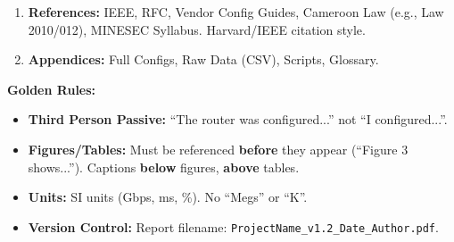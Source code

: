 \documentclass[11pt]{article}
\begin{document}
\begin{methode}
\begin{enumerate}
    \item \textbf{References:} IEEE, RFC, Vendor Config Guides, Cameroon Law (e.g., Law 2010/012), MINESEC Syllabus. Harvard/IEEE citation style.
    \item \textbf{Appendices:} Full Configs, Raw Data (CSV), Scripts, Glossary.
\end{enumerate}
\textbf{Golden Rules:} 
\begin{itemize}
    \item \textbf{Third Person Passive:} ``The router was configured...'' not ``I configured...''.
    \item \textbf{Figures/Tables:} Must be referenced \textbf{before} they appear (``Figure 3 shows...''). Captions \textbf{below} figures, \textbf{above} tables.
    \item \textbf{Units:} SI units (Gbps, ms, \%). No ``Megs'' or ``K''.
    \item \textbf{Version Control:} Report filename: \texttt{ProjectName\_v1.2\_Date\_Author.pdf}.
\end{itemize}
\end{methode}
\end{document}
